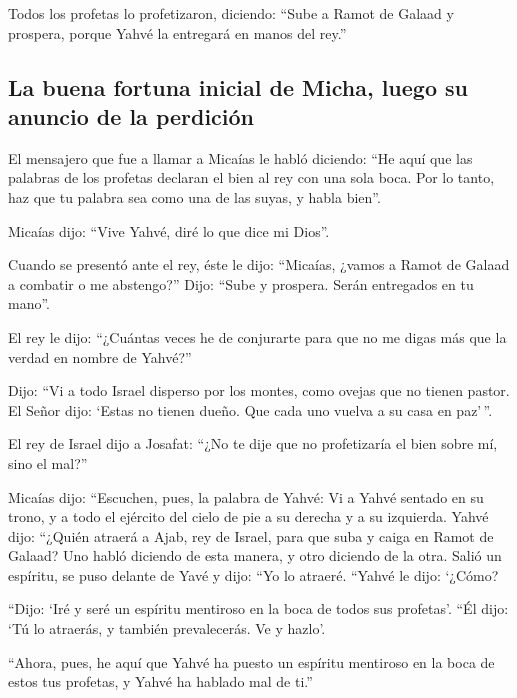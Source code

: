  Todos los profetas lo profetizaron, diciendo: ``Sube a
Ramot de Galaad y prospera, porque Yahvé la entregará en manos del
rey.''

\hypertarget{la-buena-fortuna-inicial-de-micha-luego-su-anuncio-de-la-perdiciuxf3n}{%
\subsection{La buena fortuna inicial de Micha, luego su anuncio de la
perdición}\label{la-buena-fortuna-inicial-de-micha-luego-su-anuncio-de-la-perdiciuxf3n}}

 El mensajero que fue a llamar a Micaías le habló
diciendo: ``He aquí que las palabras de los profetas declaran el bien al
rey con una sola boca. Por lo tanto, haz que tu palabra sea como una de
las suyas, y habla bien''.

 Micaías dijo: ``Vive Yahvé, diré lo que dice mi Dios''.

 Cuando se presentó ante el rey, éste le dijo: ``Micaías,
¿vamos a Ramot de Galaad a combatir o me abstengo?'' Dijo: ``Sube y
prospera. Serán entregados en tu mano''.

 El rey le dijo: ``¿Cuántas veces he de conjurarte para
que no me digas más que la verdad en nombre de Yahvé?''

 Dijo: ``Vi a todo Israel disperso por los montes, como
ovejas que no tienen pastor. El Señor dijo: `Estas no tienen dueño. Que
cada uno vuelva a su casa en paz'\,''.

 El rey de Israel dijo a Josafat: ``¿No te dije que no
profetizaría el bien sobre mí, sino el mal?''

 Micaías dijo: ``Escuchen, pues, la palabra de Yahvé: Vi
a Yahvé sentado en su trono, y a todo el ejército del cielo de pie a su
derecha y a su izquierda.  Yahvé dijo: ``¿Quién atraerá a
Ajab, rey de Israel, para que suba y caiga en Ramot de Galaad? Uno habló
diciendo de esta manera, y otro diciendo de la otra. 
Salió un espíritu, se puso delante de Yavé y dijo: ``Yo lo atraeré.
``Yahvé le dijo: `¿Cómo?

 ``Dijo: `Iré y seré un espíritu mentiroso en la boca de
todos sus profetas'. ``Él dijo: `Tú lo atraerás, y también prevalecerás.
Ve y hazlo'.

 ``Ahora, pues, he aquí que Yahvé ha puesto un espíritu
mentiroso en la boca de estos tus profetas, y Yahvé ha hablado mal de
ti.''

